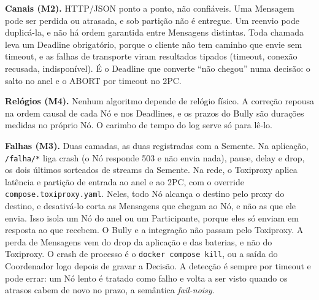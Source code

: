 \documentclass[conference]{IEEEtran}
\newcommand{\cod}[1]{\texttt{\upshape #1}}
\begin{document}
\textbf{Canais (M2).} HTTP/JSON ponto a ponto, não confiáveis. Uma Mensagem pode ser perdida ou
atrasada, e sob partição não é entregue. Um reenvio pode duplicá-la, e não há ordem garantida
entre Mensagens distintas. Toda chamada leva um Deadline obrigatório, porque o cliente não tem
caminho que envie sem timeout, e as falhas de transporte viram resultados tipados (timeout, conexão
recusada, indisponível). É o Deadline que converte ``não chegou'' numa decisão: o salto no anel e o
ABORT por timeout no 2PC.

\textbf{Relógios (M4).} Nenhum algoritmo depende de relógio físico. A correção repousa na ordem
causal de cada Nó e nos Deadlines, e os prazos do Bully são durações medidas no próprio Nó. O
carimbo de tempo do log serve só para lê-lo.

\textbf{Falhas (M3).} Duas camadas, as duas registradas com a Semente. Na aplicação, \cod{/falha/*}
liga crash (o Nó responde 503 e não envia nada), pause, delay e drop, os dois últimos sorteados de
streams da Semente. Na rede, o Toxiproxy aplica latência e partição de entrada ao anel e ao 2PC,
com o override \cod{compose.toxiproxy.yaml}. Neles, todo Nó alcança o destino pelo proxy do
destino, e desativá-lo corta as Mensagens que chegam ao Nó, e não as que ele envia. Isso isola um
Nó do anel ou um Participante, porque eles só enviam em resposta ao que recebem. O Bully e a
integração não passam pelo Toxiproxy. A perda de Mensagens vem do drop da aplicação e das baterias, e não do Toxiproxy. O crash
de processo é o \cod{docker compose kill}, ou a saída do Coordenador logo depois de gravar a
Decisão. A detecção é sempre por timeout e pode errar: um Nó lento é tratado como falho e volta a
ser visto quando os atrasos cabem de novo no prazo, a semântica \emph{fail-noisy}.
\end{document}
